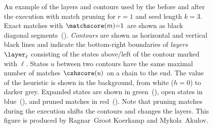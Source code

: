 \begin{figure}[t]
  \centering
  \hspace{0.01\linewidth}
  \caption[Execution of the chaining seed heuristic with pruning]{An example of
  the layers and contours used by the \csh before and after the \A execution
  with match pruning for $r{=}1$ and seed length $k{=}3$. Exact matches with
  ${\matchscore(m){=}1}$ are shown as black diagonal segments~(\blackmatch{}).
  \emph{Contours} are shown as horizontal and vertical black lines and indicate
  the bottom-right boundaries of \emph{layers} $\layer_\ell$ consisting of the
  states above/left of the contour marked with $\ell$. States $u$ between two
  contours have the same maximal number of matches $\cshscore(u)$ on a chain to
  the end. The value of the heuristic is shown in the background, from white
  ($h{=}0$) to darker grey.  Expanded states are shown in
  green~(\greensquare{}), open states in blue~(\bluesquare{}), and pruned
  matches in red~(\redmatch{}). Note that pruning matches during the \A
  execution shifts the contours and changes the layers. This figure is produced
  by Ragnar~Groot Koerkamp and Mykola~Akulov.}
  \label{GLOBALfig:contours}
\end{figure}
